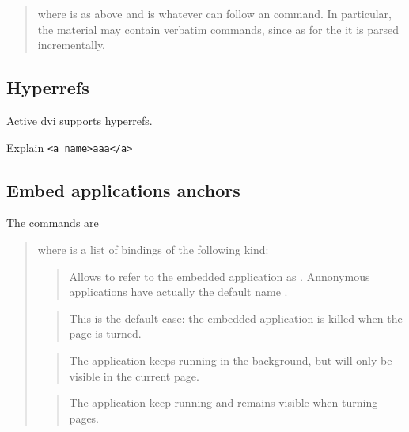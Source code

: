 \documentclass{article}
\begin{document}
\medskip\noindent
\docdef \advitransbox {}
\begin{quote}
where  is as above and  is
whatever can follow an \docdef \hbox{} command. In particular, the material
may contain verbatim commands, since as for the \docdef\hbox{} it is 
parsed incrementally.
\end{quote}

\subsection {Hyperrefs}

Active dvi supports hyperrefs. 

Explain \verb"<a name>aaa</a>"

\subsection {Embed applications anchors}

The commands are 

\medskip\noindent
\docdef \adviembed{} 

\begin{quote}
where  is a list of bindings of the following kind:

\begin{quote}
Allows to refer to the embedded application as . 
Annonymous applications have actually the default name .
\end{quote}


\begin{quote}
This is the default case: the embedded application is killed when the page
is turned.
\end{quote}


\begin{quote}
The application keeps running in the background, but will only be visible in
the current page.
\end{quote}

\begin{quote}
The application keep running and remains visible when turning pages.
\end{quote}

\end{quote}
\end{document}
